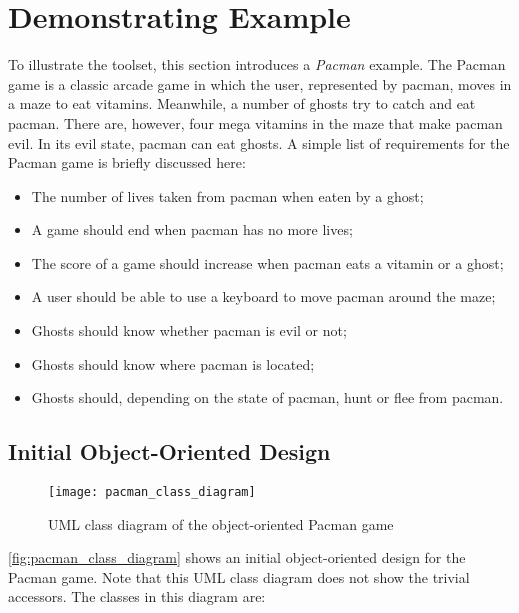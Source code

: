 \section{Demonstrating Example}
\label{sec:demonstratingexample}
To illustrate the \Compose* toolset, this section introduces a \emph{Pacman} example.
The Pacman game is a classic arcade game in which the user, represented by pacman, moves in a maze to eat vitamins.
Meanwhile, a number of ghosts try to catch and eat pacman.
There are, however, four mega vitamins in the maze that make pacman evil.
In its evil state, pacman can eat ghosts.
A simple list of requirements for the Pacman game is briefly discussed here:

\begin{itemize}[noitemsep]
  \item The number of lives taken from pacman when eaten by a ghost;
  \item A game should end when pacman has no more lives;
  \item The score of a game should increase when pacman eats a vitamin or a ghost;
  \item A user should be able to use a keyboard to move pacman around the maze;
  \item Ghosts should know whether pacman is evil or not;
  \item Ghosts should know where pacman is located;
  \item Ghosts should, depending on the state of pacman, hunt or flee from pacman.
\end{itemize}

\subsection{Initial Object-Oriented Design}

\begin{figure}
  \centering
  \texttt{[image: pacman\_class\_diagram]}
  \caption{UML class diagram of the object-oriented Pacman game}
  \label{fig:pacman_class_diagram}
\end{figure}

%
\autoref{fig:pacman_class_diagram} shows an initial object-oriented design for the Pacman game.
Note that this UML class diagram does not show the trivial accessors.
The classes in this diagram are:

